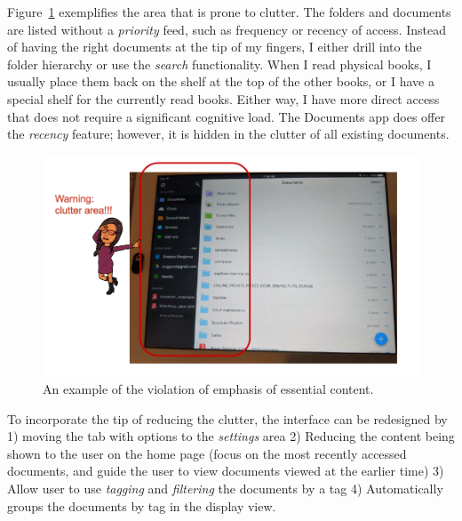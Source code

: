 \documentclass[12pt,letterpaper]{article}
\begin{document}
Figure~\ref{fig::4} exemplifies the area that is prone to clutter. The folders and documents are listed without a \textit{priority} feed, such as frequency or recency of access. Instead of having the right documents at the tip of my fingers, I either drill into the folder hierarchy or use the \textit{search} functionality. When I read physical books, I usually place them back on the shelf at the top of the other books, or I have a special shelf for the currently read books. Either way, I have more direct access that does not require a significant cognitive load. The Documents app does offer the \textit{recency} feature; however, it is hidden in the clutter of all existing documents.   

\begin{figure}[h]
\centering
\includegraphics[scale=.3]{figures/p2/clutter.png}
\caption{An example of the violation of emphasis of essential content.}
\label{fig::4}
\end{figure}

To incorporate the tip of reducing the clutter, the interface can be redesigned by 1) moving the tab with options to the \textit{settings} area 2) Reducing the content being shown to the user on the home page (focus on the most recently accessed documents, and guide the user to view documents viewed at the earlier time) 3) Allow user to use \textit{tagging} and \textit{filtering} the documents by a tag 4) Automatically groups the documents by tag in the display view.  
\end{document}

